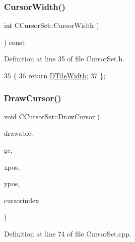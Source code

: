 \subsubsection{\texorpdfstring{Cursor\+Width()}{CursorWidth()}}
{\footnotesize\ttfamily int C\+Cursor\+Set\+::\+Cursor\+Width (\begin{DoxyParamCaption}{ }\end{DoxyParamCaption}) const\hspace{0.3cm}{\ttfamily [inline]}}



Definition at line 35 of file Cursor\+Set.\+h.


\begin{DoxyCode}
35                                \{
36             \textcolor{keywordflow}{return} \hyperlink{classCGraphicTileset_a2d0c7d19865b81911a3a43d5cae50e00}{DTileWidth};
37         \};
\end{DoxyCode}
\hypertarget{classCCursorSet_ab28cc2871e723b2509a5036eac1086ba}{}\label{classCCursorSet_ab28cc2871e723b2509a5036eac1086ba} 
\subsubsection{\texorpdfstring{Draw\+Cursor()}{DrawCursor()}}
{\footnotesize\ttfamily void C\+Cursor\+Set\+::\+Draw\+Cursor (\begin{DoxyParamCaption}\item[{Gdk\+Drawable $\ast$}]{drawable,  }\item[{Gdk\+GC $\ast$}]{gc,  }\item[{gint}]{xpos,  }\item[{gint}]{ypos,  }\item[{int}]{cursorindex }\end{DoxyParamCaption})}



Definition at line 74 of file Cursor\+Set.\+cpp.



